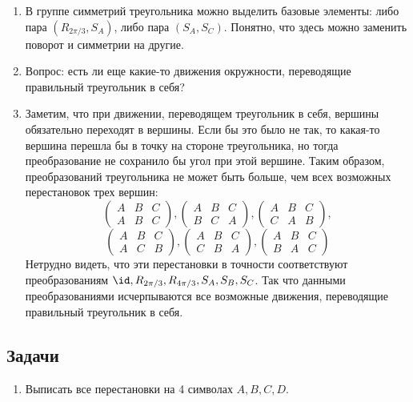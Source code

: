 \begin{enumerate}
\item В группе симметрий треугольника можно выделить базовые элементы: либо пара $(R_{2\pi/3}, S_A)$, либо пара $(S_A,S_C)$. Понятно, что здесь можно заменить поворот и симметрии на другие.
\item Вопрос: есть ли еще какие-то движения окружности, переводящие правильный треугольник в себя?
\item Заметим, что при движении, переводящем треугольник в себя, вершины обязательно переходят в вершины. Если бы это было не так, то какая-то вершина перешла бы в точку на стороне треугольника, но тогда преобразование не сохранило бы угол при этой вершине. Таким образом, преобразований треугольника не может быть больше, чем всех возможных перестановок трех вершин:
$$
\begin{pmatrix}
A & B & C \\
A & B & C
\end{pmatrix},
\begin{pmatrix}
A & B & C \\
B & C & A
\end{pmatrix},
\begin{pmatrix}
A & B & C \\
C & A & B
\end{pmatrix},
$$
$$
\begin{pmatrix}
A & B & C \\
A & C & B
\end{pmatrix},
\begin{pmatrix}
A & B & C \\
C & B & A
\end{pmatrix},
\begin{pmatrix}
A & B & C \\
B & A & C
\end{pmatrix}
$$
Нетрудно видеть, что эти перестановки в точности соответствуют преобразованиям $\id, R_{2\pi/3}, R_{4\pi/3}, S_A, S_B, S_C$. Так что данными преобразованиями исчерпываются все возможные движения, переводящие правильный треугольник в себя.
\end{enumerate}
\subsection*{Задачи}
\begin{enumerate}
\item Выписать все перестановки на 4 символах $A,B,C,D$.
\end{enumerate}




